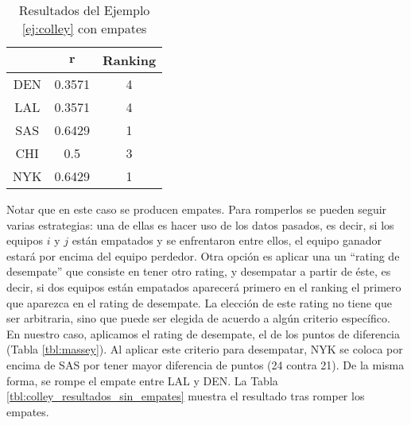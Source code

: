 \begin{ejemplo}
\begin{table}[h]
\centering
\caption{Resultados del Ejemplo \ref{ej:colley} con empates}
\label{tbl:colley_con_empates}
\begin{tabular}{@{}ccc@{}}
\cmidrule(l){2-3}
    & $\mathbf{r}$ & Ranking \\ \midrule
DEN & 0.3571       & 4       \\
LAL & 0.3571       & 4       \\
SAS & 0.6429       & 1       \\
CHI & 0.5          & 3       \\
NYK & 0.6429       & 1       \\ \bottomrule
\end{tabular}
\end{table}

Notar que en este caso se producen empates. Para romperlos se pueden seguir varias estrategias: una de ellas es hacer uso de los datos pasados, es decir, si los equipos $i$ y $j$ están empatados y se enfrentaron entre ellos, el equipo ganador estará por encima del equipo perdedor. Otra opción es aplicar una un ``rating de desempate'' que consiste en tener otro rating, y desempatar a partir de éste, es decir, si dos equipos están empatados aparecerá primero en el ranking el primero que aparezca en el rating de desempate. La elección de este rating no tiene que ser arbitraria, sino que puede ser elegida de acuerdo a algún criterio específico.\\

En nuestro caso, aplicamos el rating de desempate, el de los puntos de diferencia (Tabla \ref{tbl:massey}). Al aplicar este criterio para desempatar, NYK se coloca por encima de SAS por tener mayor diferencia de puntos (24 contra 21). De la misma forma, se rompe el empate entre LAL y DEN. La Tabla \ref{tbl:colley_resultados_sin_empates} muestra el resultado tras romper los empates.


\end{ejemplo}
